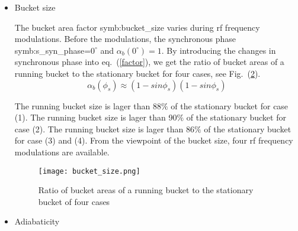 \begin{itemize}
The rf frequency modulations make the synchronous phase deviate from the norminal value $0^\circ$. Fig.~\ref{synch_phase} shows the changes in the synchronous phase, $\Delta \phi_s$ (t). It is calculated by introducing values into eq.~(\ref{?}). For case (1), the phase jumps in \gls{symb:syn_phase} appear at the start and end of the frequency modulation, and at two points where the slope of modulation changes from upward to flat and from flat to downward. For case (2), the phase jumps in $\Delta \phi_s(t)$ appear at the start and end of the frequency modulation, and at the midpoint where the slope of modulation changes from upward to downward. For case (3) and (4), the  synchronous phase $\Delta \phi_s(t)$ during the modulations are continuous. The phase jumps are dangerous for the beam to follow. From the view point of the synchronous phase, four cases of rf frequency modulations are available.
\begin{figure}[!htb]
   \centering   
   \texttt{[image: synch\_phase.png]}
   \caption{Changes in synchronous phase of four cases}
   \label{synch_phase}
\end{figure}
\item Bucket size

The bucket area factor \gls{symb:bucket_size} varies during rf frequency modulations. Before the modulations, the synchronous phase \gls{symb:s_syn_phase}=$0^\circ$ and  $\alpha_b(0^\circ) = 1$. By introducing the changes in synchronous phase into eq.~(\ref{factor}), we get the ratio of bucket areas of a running bucket to the stationary bucket for four cases, see Fig.~(\ref{bucket_size}).
\begin{equation}
\alpha_b (\phi_s) \approx (1-sin \phi_s)(1-sin \phi_s)\label{factor}
\end{equation}

 The running bucket size is lager than 88$\%$ of the stationary bucket for case (1). The running bucket size is lager than 90$\%$ of the stationary bucket for case (2). The running bucket size is lager than 86$\%$ of the stationary bucket for case (3) and (4). From the viewpoint of the bucket size, four rf frequency modulations are available.  

\begin{figure}[!htb]
   \centering   
   \texttt{[image: bucket\_size.png]}
   \caption{Ratio of bucket areas of a running bucket to the stationary bucket of four cases}
   \label{bucket_size}
\end{figure}
\item Adiabaticity


\end{itemize}
